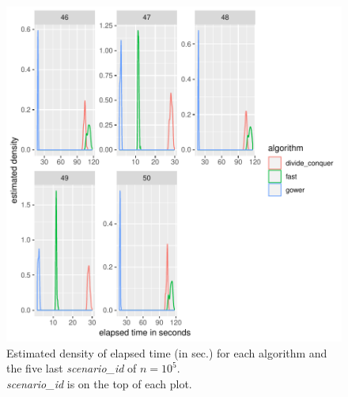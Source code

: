 \documentclass[11pt]{report}
\begin{document}
\begin{figure}[h]
\centering
    \includegraphics[scale=2]{./images/elapsed_time_100000_part2.pdf}
    \caption{
    Estimated density of elapsed time (in sec.) for each algorithm and the five 
    last \textit{scenario\_id} of $n=10^5$.\\
    \textit{scenario\_id} is on the top of each plot.
    }
\end{figure}

\FloatBarrier
\end{document}
